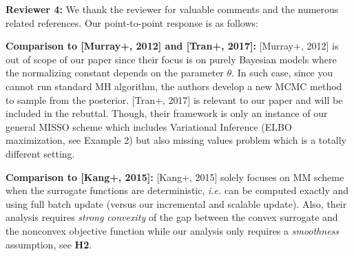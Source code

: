 \documentclass{article}
\begin{document}
\textbf{\textcolor{green!50!black}{Reviewer 4:}} We thank the reviewer for valuable comments and the numerous related references. Our point-to-point response is as follows:

\textbf{Comparison to [Murray+, 2012] and [Tran+, 2017]:} 
[Murray+, 2012] is out of scope of our paper since their focus is on purely Bayesian models where the normalizing constant depends on the parameter $\theta$.
In such case, since you cannot run standard MH algorithm, the authors develop a new MCMC method to sample from the posterior.
[Tran+, 2017] is relevant to our paper and will be included in the rebuttal. 
Though, their framework is only an instance of our general MISSO scheme which includes Variational Inference (ELBO maximization, see Example 2) but also missing values problem which is a totally different setting.

\textbf{Comparison to [Kang+, 2015]:} 
[Kang+, 2015] solely focuses on MM scheme when the surrogate functions are deterministic, \textit{i.e.} can be computed exactly and using full batch update (versus our incremental and scalable update).
Also, their analysis requires \emph{strong convexity} of the gap between the convex surrogate and the nonconvex objective function while our analysis only requires a \emph{smoothness} assumption, see \textbf{H2}.

\end{document}
